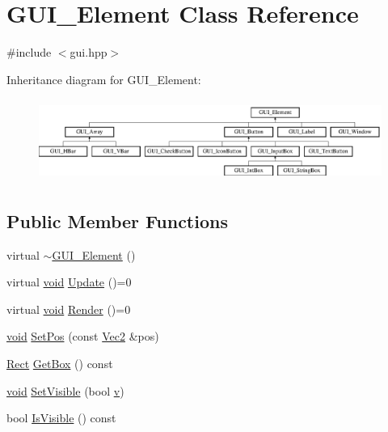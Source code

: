 \hypertarget{class_g_u_i___element}{\section{G\-U\-I\-\_\-\-Element Class Reference}
\label{class_g_u_i___element}
}


{\ttfamily \#include $<$gui.\-hpp$>$}

Inheritance diagram for G\-U\-I\-\_\-\-Element\-:\begin{figure}[H]
\begin{center}
\leavevmode
\includegraphics[height=2.711864cm]{class_g_u_i___element}
\end{center}
\end{figure}
\subsection*{Public Member Functions}
\begin{DoxyCompactItemize}
\item 
virtual \hyperlink{class_g_u_i___element_a96e79622bfd7228a05d991c852262599}{$\sim$\-G\-U\-I\-\_\-\-Element} ()
\item 
virtual \hyperlink{_s_d_l__opengles2__gl2ext_8h_ae5d8fa23ad07c48bb609509eae494c95}{void} \hyperlink{class_g_u_i___element_abc13729af781e088066710336c14234c}{Update} ()=0
\item 
virtual \hyperlink{_s_d_l__opengles2__gl2ext_8h_ae5d8fa23ad07c48bb609509eae494c95}{void} \hyperlink{class_g_u_i___element_a877f1e7d670634e6a4cc8e0227a65bda}{Render} ()=0
\item 
\hyperlink{_s_d_l__opengles2__gl2ext_8h_ae5d8fa23ad07c48bb609509eae494c95}{void} \hyperlink{class_g_u_i___element_adb7aca2c79b8c416e813242efec0896d}{Set\-Pos} (const \hyperlink{class_vec2}{Vec2} \&pos)
\item 
\hyperlink{class_rect}{Rect} \hyperlink{class_g_u_i___element_a6218ee3e4d0111ec9b89a84bb6fcb0a6}{Get\-Box} () const 
\item 
\hyperlink{_s_d_l__opengles2__gl2ext_8h_ae5d8fa23ad07c48bb609509eae494c95}{void} \hyperlink{class_g_u_i___element_aa485cc97186c3bd8679594d930ce6718}{Set\-Visible} (bool \hyperlink{_s_d_l__opengl_8h_a10a82eabcb59d2fcd74acee063775f90}{v})
\item 
bool \hyperlink{class_g_u_i___element_a91118a362af7f8577dc11a4bdd8c2390}{Is\-Visible} () const 
\end{DoxyCompactItemize}
